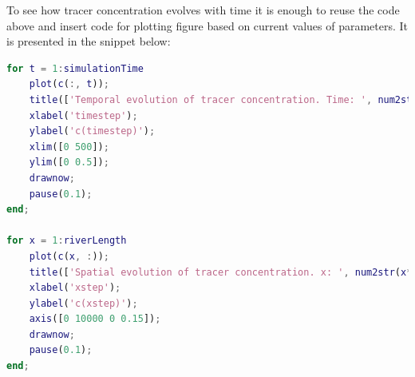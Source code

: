 \documentclass[12pt]{article}
\begin{document}
To see how tracer concentration evolves with time it is enough to reuse the code above and insert code for plotting figure based on current values of parameters. It is presented in the snippet below:

\begin{lstlisting}[language=Matlab, caption = {Temporal and spatial evolution of tracer concentration visualized in MATLAB.}, frame=single]
for t = 1:simulationTime
	plot(c(:, t));
	title(['Temporal evolution of tracer concentration. Time: ', num2str(t*dt), ' Mass: ', num2str(mass(1, t))]);
	xlabel('timestep');
	ylabel('c(timestep)');
	xlim([0 500]);
	ylim([0 0.5]);
	drawnow;
	pause(0.1);
end;

for x = 1:riverLength
	plot(c(x, :));
	title(['Spatial evolution of tracer concentration. x: ', num2str(x*dx)]);
	xlabel('xstep');
	ylabel('c(xstep)');
	axis([0 10000 0 0.15]);
	drawnow;
	pause(0.1);
end;
\end{lstlisting}
\end{document}
